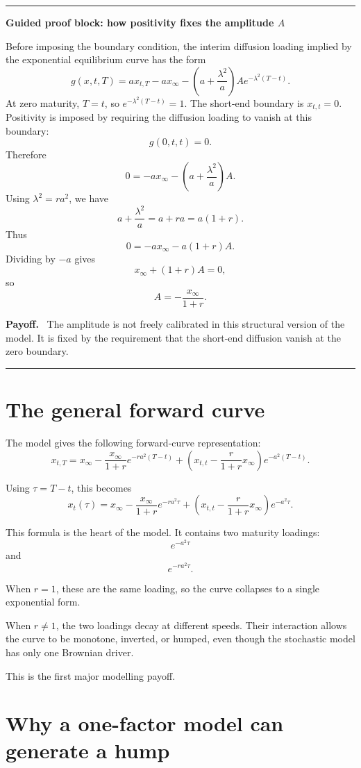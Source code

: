 \documentclass[11pt]{article}
\theoremstyle{plainbreak}
\newenvironment{proofblock}[1]{%
    \vspace{0.5em}\hrule\vspace{0.7em}%
    {\bfseries Guided proof block: #1}\par\vspace{0.2em}%
}{%
    \vspace{0.5em}\hrule\vspace{0.7em}%
}
\newenvironment{takeaway}{%
    \vspace{0.4em}\noindent\textbf{Payoff.}\ }{\par\vspace{0.4em}}
\begin{document}
\begin{proofblock}{how positivity fixes the amplitude \(A\)}
Before imposing the boundary condition, the interim diffusion loading implied by the exponential equilibrium curve has the form
\[
g(x,t,T)
=
a x_{t,T}-a x_\infty-
\left(a+\frac{\lambda^2}{a}\right)A e^{-\lambda^2(T-t)}.
\]
At zero maturity, \(T=t\), so \(e^{-\lambda^2(T-t)}=1\). The short-end boundary is \(x_{t,t}=0\). Positivity is imposed by requiring the diffusion loading to vanish at this boundary:
\[
g(0,t,t)=0.
\]
Therefore
\[
0=-a x_\infty-
\left(a+\frac{\lambda^2}{a}\right)A.
\]
Using \(\lambda^2=ra^2\), we have
\[
a+\frac{\lambda^2}{a}=a+ra=a(1+r).
\]
Thus
\[
0=-a x_\infty-a(1+r)A.
\]
Dividing by \(-a\) gives
\[
x_\infty+(1+r)A=0,
\]
so
\[
A=-\frac{x_\infty}{1+r}.
\]

\begin{takeaway}
The amplitude is not freely calibrated in this structural version of the model. It is fixed by the requirement that the short-end diffusion vanish at the zero boundary.
\end{takeaway}
\end{proofblock}

\section{The general forward curve}

The model gives the following forward-curve representation:
\[
x_{t,T}
=
x_\infty
-
\frac{x_\infty}{1+r}e^{-ra^2(T-t)}
+
\left(x_{t,t}-\frac{r}{1+r}x_\infty\right)e^{-a^2(T-t)}.
\]

Using \(\tau=T-t\), this becomes
\[
x_t(\tau)
=
x_\infty
-
\frac{x_\infty}{1+r}e^{-ra^2\tau}
+
\left(x_{t,t}-\frac{r}{1+r}x_\infty\right)e^{-a^2\tau}.
\]

This formula is the heart of the model. It contains two maturity loadings:
\[
e^{-a^2\tau}
\]
and
\[
e^{-ra^2\tau}.
\]

When \(r=1\), these are the same loading, so the curve collapses to a single exponential form.

When \(r\neq 1\), the two loadings decay at different speeds. Their interaction allows the curve to be monotone, inverted, or humped, even though the stochastic model has only one Brownian driver.

This is the first major modelling payoff.

\section{Why a one-factor model can generate a hump}
\end{document}
